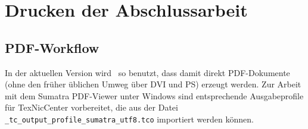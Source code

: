 \chapter{Drucken der Abschlussarbeit}
\label{chap:Drucken}




\section{PDF-Workflow}
\label{sec:pdf}

In der aktuellen Version wird \latex\ so benutzt, dass damit direkt PDF-Dokumente (ohne den früher üblichen Umweg über DVI und PS) erzeugt werden.
Zur Arbeit mit dem Sumatra PDF-Viewer unter Windows sind entsprechende Ausgabeprofile für TexNicCenter vorbereitet, die aus der Datei \verb!_tc_output_profile_sumatra_utf8.tco! 
importiert werden können. %


